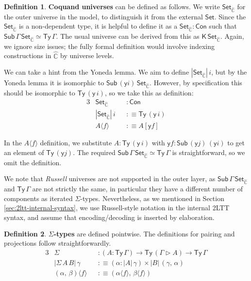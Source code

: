 \documentclass[12pt,a4paper,twoside,openany]{book}
\theoremstyle{remark}
\theoremstyle{definition}
\newtheorem{mydefinition}{Definition}
\theoremstyle{theorem}
\newcommand{\ms}[1]{\mathsf{#1}}
\newcommand{\mbb}[1]{\mathbb{#1}}
\newcommand{\Con}{\mathsf{Con}}
\newcommand{\Sub}{\mathsf{Sub}}
\newcommand{\Ty}{\mathsf{Ty}}
\newcommand{\Set}{\mathsf{Set}}
\newcommand{\ext}{\triangleright}
\newcommand{\K}{\mathsf{K}}
\newcommand{\hmbbC}{\hat{\mbb{C}}}
\newcommand{\lab}{\langle}
\newcommand{\rab}{\rangle}
\newcommand{\defn}{:\equiv}
\newcommand{\yon}{\ms{y}}
\begin{document}
\begin{mydefinition}
\textbf{Coquand universes} can be defined as follows. We write $\Set_{\hmbbC}$
for the outer universe in the model, to distinguish it from the external
$\Set$. Since the $\Set_{\hmbbC}$ is a non-dependent type, it is helpful to
define it as a $\Set_{\hmbbC} : \Con$ such that $\Sub\,\Gamma\,\Set_{\hmbbC}
\simeq \Ty\,\Gamma$.  The usual universe can be derived from this as
$\K\,\Set_{\hmbbC}$. Again, we ignore size issues; the fully formal definition
would involve indexing constructions in $\hmbbC$ by universe levels.

We can take a hint from the Yoneda lemma. We aim to define $|\Set_{\hmbbC}|\,i$,
but by the Yoneda lemma it is isomorphic to $\Sub\,(\yon
i)\,\Set_{\hmbbC}$. However, by specification this should be isomorphic to
$\Ty\,(\yon\,i)$, so we take this as definition:
\begin{alignat*}{3}
  & \Set_{\hmbbC} &&: \Con\\
  &|\Set_{\hmbbC}|\,i &&\defn \Ty\,(\yon\,i)\\
  &A \lab f \rab &&\defn A[\yon f]
\end{alignat*}
\end{mydefinition}
In the $A \lab f \rab$ definition, we substitute $A : \Ty\,(\yon\,i)$ with $\yon
f : \Sub\,(\yon j)\,(\yon i)$ to get an element of $\Ty\,(\yon j)$.  The
required $\Sub\,\Gamma\,\Set_{\hmbbC} \simeq \Ty\,\Gamma$ is straightforward, so
we omit the definition.

We note that \emph{Russell} universes are not supported in the outer layer, as
$\Sub\,\Gamma\,\Set_{\hmbbC}$ and $\Ty\,\Gamma$ are not strictly the same, in
particular they have a different number of components as iterated
$\Sigma$-types. Nevertheless, as we mentioned in Section \ref{sec:2ltt-internal-syntax}, we
use Russell-style notation in the internal 2LTT syntax, and assume that encoding/decoding
is inserted by elaboration.

\begin{mydefinition}
\textbf{$\Sigma$-types} are defined pointwise. The definitions for pairing and
projections follow straightforwardly.
\begin{alignat*}{3}
  & \Sigma  &&: (A : \Ty\,\Gamma) \to \Ty\,(\Gamma\ext A) \to \Ty\,\Gamma\\    & |\Sigma\,A\,B|\,\gamma && \defn (\alpha : |A|\,\gamma) \times |B|\,(\gamma,\,\alpha)\\
  & (\alpha,\,\beta) \lab f \rab && \defn (\alpha \lab f \rab,\, \beta \lab f \rab)
\end{alignat*}
\end{mydefinition}
\end{document}
